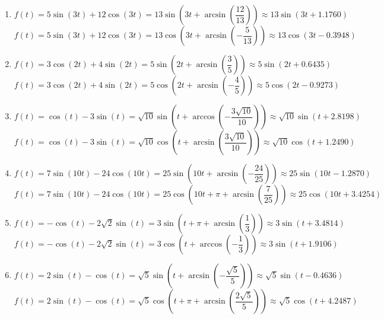 \documentclass{ximera}
\begin{document}
\begin{enumerate}

\setcounter{enumi}{\value{HW}}

\item $f(t) = 5\sin(3t) + 12\cos(3t) = 13\sin\left(3t + \arcsin\left(\dfrac{12}{13}\right)\right) \approx 13\sin(3t + 1.1760)$ \\

$f(t) = 5\sin(3t) + 12\cos(3t) = 13\cos\left(3t + \arcsin\left(-\dfrac{5}{13}\right)\right) \approx 13\cos(3t -0.3948)$


\item $f(t) = 3\cos(2t) + 4\sin(2t) = 5\sin\left(2t+\arcsin\left(\dfrac{3}{5}\right) \right) \approx 5\sin(2t+0.6435)$ \\

 $f(t) = 3\cos(2t) + 4\sin(2t) = 5\cos\left(2t+\arcsin\left(-\dfrac{4}{5}\right) \right) \approx 5\cos(2t-0.9273)$
 
 
\item $f(t) = \cos(t) - 3\sin(t) = \sqrt{10} \sin\left(t + \arccos\left(-\dfrac{3\sqrt{10}}{10} \right)\right) \approx \sqrt{10} \sin(t + 2.8198)$ \\

$f(t) = \cos(t) - 3\sin(t) = \sqrt{10} \cos\left(t + \arcsin\left(\dfrac{3\sqrt{10}}{10} \right)\right) \approx \sqrt{10} \cos(t + 1.2490)$
 
 
\item  $f(t) = 7\sin(10t) - 24\cos(10t) = 25\sin\left( 10t + \arcsin\left(-\dfrac{24}{25}\right)\right) \approx 25 \sin(10t-1.2870)$ \\

$f(t) = 7\sin(10t) - 24\cos(10t) = 25\cos\left( 10t + \pi + \arcsin\left(\dfrac{7}{25}\right)\right) \approx 25 \cos(10t+3.4254)$


\item  $f(t) = -\cos(t) - 2\sqrt{2} \sin(t) = 3\sin\left(t+\pi + \arcsin\left(\dfrac{1}{3}\right)\right) \approx 3\sin(t+3.4814)$ \\


$f(t) = -\cos(t) - 2\sqrt{2} \sin(t) = 3\cos\left(t+ \arccos\left(-\dfrac{1}{3}\right)\right) \approx 3\sin(t+1.9106)$


\item $f(t) = 2\sin(t) - \cos(t) = \sqrt{5}\sin\left(t  + \arcsin\left(-\dfrac{\sqrt{5}}{5}\right)\right) \approx \sqrt{5}\sin(t -0.4636)$ \\

$f(t) = 2\sin(t) - \cos(t) = \sqrt{5}\cos\left(t  + \pi + \arcsin\left(\dfrac{2\sqrt{5}}{5}\right)\right) \approx \sqrt{5}\cos(t + 4.2487)$

\setcounter{HW}{\value{enumi}}

\end{enumerate}
\end{document}
